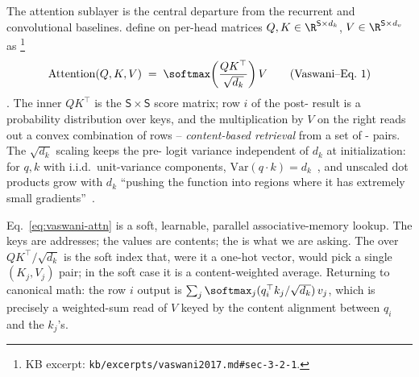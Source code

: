 The attention sublayer is the central departure from the
recurrent and convolutional baselines. \citet{vaswani2017} define
 on per-head matrices
$Q, K \in \R^{\mathsf{S} \times d_k}$, $V \in \R^{\mathsf{S} \times d_v}$
as%
\footnote{KB excerpt: \nolinkurl{kb/excerpts/vaswani2017.md#sec-3-2-1}.}
\begin{equation}
  \mathrm{Attention}(Q, K, V) \;=\;
  \softmax\!\left(\frac{Q K^\top}{\sqrt{d_k}}\right) V
  \tag{Vaswani--Eq.~1}
  \label{eq:vaswani-attn}
\end{equation}
\citep[\S 3.2.1, Eq.~1]{vaswani2017}. The inner $Q K^\top$ is the
$\mathsf{S} \times \mathsf{S}$ score matrix; row $i$ of the post-
result is a probability distribution over keys, and the multiplication
by $V$ on the right reads out a convex combination of  rows --
\emph{content-based retrieval} from a set of - pairs. The
$\sqrt{d_k}$ scaling keeps the pre- logit variance independent
of $d_k$ at initialization: for $q, k$ with i.i.d.\ unit-variance
components, $\mathrm{Var}(q \cdot k) = d_k$~\citep[\S 3.2.1, fn.~4]{vaswani2017}, and
unscaled dot products grow with $d_k$ ``pushing the  function
into regions where it has extremely small gradients''~\citep[\S
3.2.1]{vaswani2017}.

\begin{analogy}
Eq.~\eqref{eq:vaswani-attn} is a soft, learnable, parallel
associative-memory lookup. The keys are addresses; the values are
contents; the  is what we are asking. The  over
$Q K^\top / \sqrt{d_k}$ is the soft index that, were it a
one-hot vector, would pick a single $(K_j, V_j)$ pair; in the
soft case it is a content-weighted average. Returning to canonical
math: the row $i$ output is
$\sum_j \softmax_j(q_i^\top k_j / \sqrt{d_k}) \, v_j$,
which is precisely a weighted-sum read of $V$ keyed by the
content alignment between $q_i$ and the $k_j$'s.
\end{analogy}

